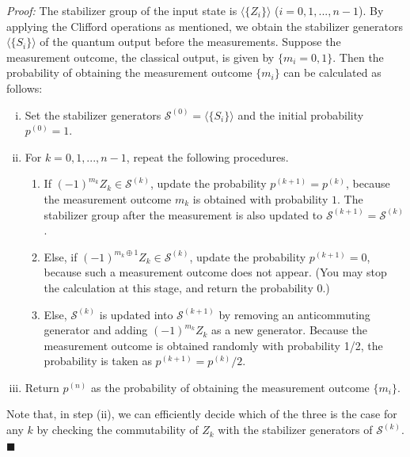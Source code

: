 {\it Proof:}
The stabilizer group of the input state is $\langle \{ Z_i \} \rangle$
($i=0,1,...,n-1$).
By applying the Clifford operations as mentioned, we obtain the stabilizer generators $\langle \{ S_i \} \rangle$ of the quantum output before the measurements.
Suppose the measurement outcome, the classical output, is given by $\{ m_i=0,1\}$.
Then the probability of obtaining the measurement outcome $\{m_i\}$ can be calculated as follows:
\begin{enumerate}[i)]
	\item Set the stabilizer generators $\mathcal{S}^{(0)} = \langle \{S_i\} \rangle$ and the initial probability $p^{(0)}=1$.

	\item For $k=0,1,...,n-1$, repeat the following procedures.
	\begin{enumerate}[1)]
		\item If $(-1)^{m_k} Z_k \in \mathcal{S}^{(k)}$, update the probability $p^{(k+1)}=p^{(k)}$, because the measurement outcome $m_k$ is obtained with probability $1$. 
		The stabilizer group after the measurement is also updated to $\mathcal{S}^{(k+1)}=\mathcal{S}^{(k)}$.

		\item Else, if $(-1)^{m_k\oplus 1} Z_k \in \mathcal{S}^{(k)}$, update the probability $p^{(k+1)}=0$, because such a measurement outcome does not appear. 
		(You may stop the calculation at this stage, and return the probability 0.)

		\item Else, $\mathcal{S}^{(k)}$ is updated into $\mathcal{S}^{(k+1)}$ by removing an anticommuting generator and adding $(-1)^{m_k} Z_k$ as a new generator. 
		Because the measurement outcome is obtained randomly with probability 1/2, the probability is taken as $p^{(k+1)}=p^{(k)}/2$.
	\end{enumerate}

	\item Return $p^{(n)}$ as the probability of obtaining the measurement outcome $\{ m_i \}$.
\end{enumerate}
Note that, in step (ii), we can efficiently decide which of the three is the case for any $k$ by checking the commutability of $Z_k$ with the stabilizer generators of $\mathcal{S}^{(k)}$.
\hfill $\blacksquare$

